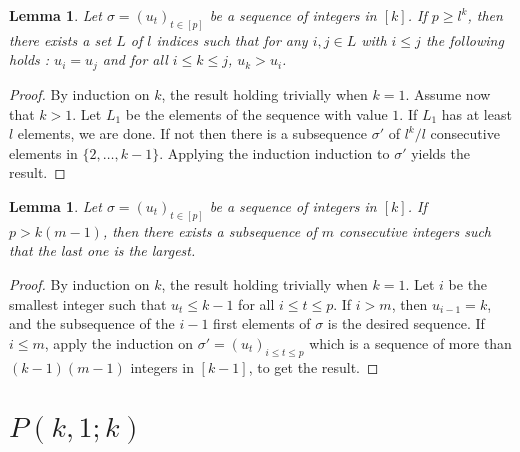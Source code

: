 \documentclass[utf8,10pt]{article}
\theoremstyle{plain}
\newtheorem{lemma}[theorem]{Lemma}
\theoremstyle{definition}
\theoremstyle{remark}
\begin{document}
\begin{lemma}\label{min}
Let $\sigma=(u_t)_{t\in [p]}$ be a sequence of integers in $[k]$. If $p\geq l^k$, then there exists a set $L$ of $l$ indices such that for any $i,j \in L$ with $i\leq j$ the following holds : $u_i=u_j$ and for all $i\leq k\leq j$, $u_k > u_i$.
\end{lemma}

\begin{proof}
By induction on $k$, the result holding trivially when $k=1$. Assume now that $k>1$. Let $L_1$ be the elements of the sequence with value $1$. If $L_1$ has at least $l$ elements, we are done.
If not then there is a subsequence $\sigma'$ of $l^k/l$ consecutive elements in $\{2, \dots , k-1\}$. Applying the induction induction to $\sigma'$ yields the result.
\end{proof}

\begin{lemma}\label{max}
Let $\sigma=(u_t)_{t\in [p]}$ be a sequence of integers in $[k]$. 
If $p > k (m-1)$, then there exists a subsequence of $m$ consecutive integers such that the
last one is the largest.
\end{lemma}

\begin{proof}
By induction on $k$, the result holding trivially when $k=1$. 
Let $i$ be the smallest integer such that $u_t\leq k-1$ for all $i\leq t\leq p$.
If $i>m$, then $u_{i-1}=k$, and the subsequence of the $i-1$ first elements of $\sigma$ is the desired sequence.
If $i\leq m$, apply the induction on $\sigma'=(u_t)_{i\leq t\leq p}$ which is a sequence of more than $(k-1)(m-1)$ integers in $[k-1]$, to get the result. 
\end{proof}











\section{$P(k,1;k)$}
\end{document}
